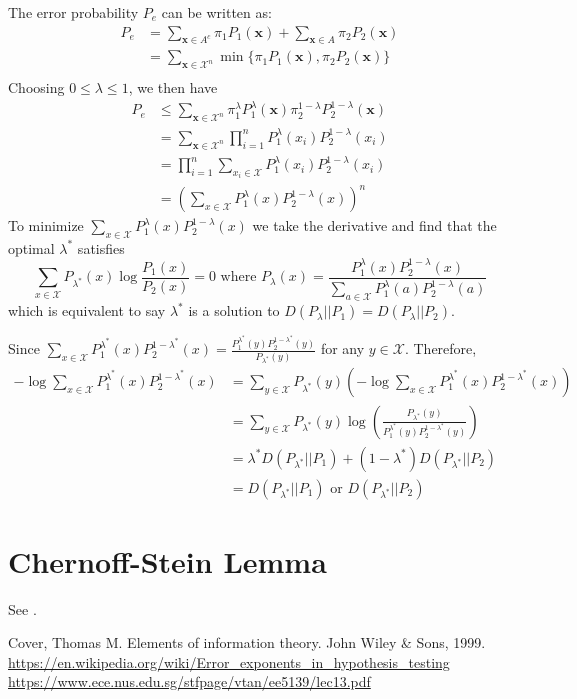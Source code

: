 \documentclass{article}
\begin{document}
The error probability $P_e$ can be written as:
\begin{align*}
P_e & = \sum_{\bm{x} \in A^c} \pi_1 P_1(\bm{x})
+ \sum_{\bm{x} \in A} \pi_2 P_2(\bm{x}) \\
& = \sum_{\bm{x} \in \mathcal{X}^n} \min \{ \pi_1 P_1(\bm{x}), \pi_2 P_2(\bm{x})\} \\
\end{align*}
Choosing $ 0 \leq \lambda \leq 1 $,
we then have
\begin{align*}
P_e & \leq \sum_{\bm{x} \in \mathcal{X}^n}  \pi_1^{\lambda} P_1^{\lambda}(\bm{x}) \pi_2^{1-\lambda} P_2^{1-\lambda}(\bm{x}) \\
& =  \sum_{\bm{x} \in \mathcal{X}^n}  \prod_{i=1}^n P_1^{\lambda}(x_i)  P_2^{1-\lambda}(x_i) \\
& = \prod_{i=1}^n \sum_{x_i\in \mathcal{X}} P_1^{\lambda}(x_i)  P_2^{1-\lambda}(x_i) \\
& = \left(\sum_{x\in \mathcal{X}} P_1^{\lambda}(x)  P_2^{1-\lambda}(x)\right)^n
\end{align*}
To minimize $\sum_{x\in \mathcal{X}} P_1^{\lambda}(x)  P_2^{1-\lambda}(x)$ we take the derivative
and find that the optimal $\lambda^*$ satisfies
\begin{equation}
\sum_{x\in \mathcal{X}} P_{\lambda^*}(x) \log \frac{P_1(x)}{P_2(x)} = 0 \textrm{ where }
P_{\lambda}(x) = \frac{P_1^{\lambda}(x)P_2^{1-\lambda}(x)}{\sum_{a\in \mathcal{X}}P_1^{\lambda}(a)P_2^{1-\lambda}(a)}
\end{equation}
which is equivalent to say $\lambda^*$ is a solution to $D(P_{\lambda}|| P_1) = D(P_{\lambda} || P_2)$.

Since $\sum_{x\in \mathcal{X}} P_1^{\lambda^*}(x)  P_2^{1-\lambda^*}(x) = \frac{P_1^{\lambda^*}(y)P_2^{1-\lambda^*}(y)}
{P_{\lambda^*}(y)}$ for any $y\in \mathcal{X}$. Therefore,
\begin{align*}
-\log \sum_{x\in \mathcal{X}} P_1^{\lambda^*}(x)  P_2^{1-\lambda^*}(x) &= \sum_{y \in \mathcal{X}} P_{\lambda^*}(y) \left(-\log \sum_{x\in \mathcal{X}} P_1^{\lambda^*}(x)  P_2^{1-\lambda^*}(x) \right)\\
& = \sum_{y \in \mathcal{X}} P_{\lambda^*}(y) \log\left(\frac{P_{\lambda^*}(y)}{P_1^{\lambda^*}(y)P_2^{1-\lambda^*}(y)}\right) \\
& = \lambda^* D(P_{\lambda^*} || P_1) + (1-\lambda^*) D(P_{\lambda^*} || P_2) \\
& = D(P_{\lambda^*} || P_1) \textrm{ or } D(P_{\lambda^*} || P_2)
\end{align*}
\section{Chernoff-Stein Lemma}
See \cite{steim}.
\begin{thebibliography}{9}
	 Cover, Thomas M. Elements of information theory. John Wiley \& Sons, 1999.
	 \url{https://en.wikipedia.org/wiki/Error_exponents_in_hypothesis_testing}
	 \url{https://www.ece.nus.edu.sg/stfpage/vtan/ee5139/lec13.pdf}
\end{thebibliography}
\end{document}
